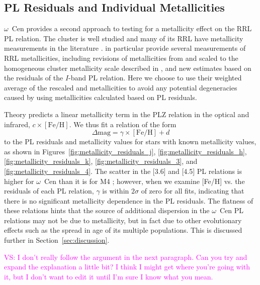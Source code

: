 \documentclass[a4paper,fleqn,usenatbib]{mnras}
\newcommand{\ocen}{$\omega$~Cen\xspace}
\providecommand{\vscomment}[1]{{\textcolor{magenta}{{VS: #1}}}\xspace}
\begin{document}
\subsection{PL Residuals and Individual Metallicities}
\label{sec:residuals}

\ocen provides a second approach to testing for a metallicity effect on the RRL PL relation. The cluster is well studied and many of its RRL have metallicity measurements in the literature \citep[e.g.][]{2006ApJ...640L..43S, 2000AJ....119.1824R, 2016arXiv160904916B}. \citet{2016arXiv160904916B} in particular provide several measurements of RRL metallicities, including revisions of metallicities from \citet{2006ApJ...640L..43S} and \citet{2000AJ....119.1824R} scaled to the homogeneous cluster metallicity scale described in \citet{2009A&A...508..695C}, and new estimates based on the residuals of the $I$-band PL relation. Here we choose to use their weighted average of the rescaled \citet{2006ApJ...640L..43S} and \citet{2000AJ....119.1824R} metallicities to avoid any potential degeneracies caused by using metallicities calculated based on PL residuals.

Theory predicts a linear metallicity term in the PLZ relation in the optical and infrared, $c\times[\text{Fe/H}]$.
We thus fit a relation of the form
\begin{equation}
\label{eqn:delta_mag}
\Delta\text{mag} = \gamma \times[\text{Fe/H}] + d
\end{equation}
to the PL residuals and metallicity values for stars with known metallicity values, as shown in Figures~\ref{fig:metallicity_residuals_j}, \ref{fig:metallicity_residuals_h}, \ref{fig:metallicity_residuals_k}, \ref{fig:metallicity_residuals_3}, and \ref{fig:metallicity_residuals_4}. The scatter in the [3.6] and [4.5] PL relations is higher for \ocen than it is for M4 \citep{2015ApJ...808...11N, 2015ApJ...799..165B}; however, when we examine [Fe/H] vs. the residuals of each PL relation, $\gamma$ is within $2\sigma$ of zero for all fits, indicating that there is no significant metallicity dependence in the PL residuals. The flatness of these relations hints that the source of additional dispersion in the \ocen PL relations may not be due to metallicity, but in fact due to other evolutionary effects such as the spread in age of its multiple populations. This is discussed further in Section~\ref{sec:discussion}.

\vscomment{I don't really follow the argument in the next paragraph. Can you try and expand the explanation a little bit? I think I might get where you're going with it, but I don't want to edit it until I'm sure I know what you mean.}
\end{document}

